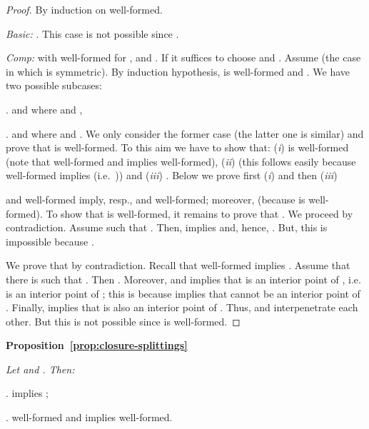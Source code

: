 \documentclass[11pt]{article}
\begin{document}
\smallskip\noindent
\begin{proof}  By induction on  well-formed.

\par\medskip\noindent
{\em Basic:} . This case is not possible since .
\par\medskip\noindent
{\em Comp:}  with  well-formed for ,  and .
If  it suffices to choose  and . Assume
 (the case in which 
is symmetric).  By induction hypothesis,  is
well-formed and .
We have  two possible subcases:

.  and  where  and , 

.  and  where  and .
We only consider the former case (the latter one is similar) and prove that  is 
well-formed. To this aim we have to show that: ({\it i})  is
well-formed (note that  well-formed and  implies 
well-formed), ({\it ii})  (this follows easily because  well-formed
implies  (i.e.\ ))
and ({\it iii}) . Below we prove first ({\it i}) and
then ({\it iii})

\par\smallskip\noindent  and 
well-formed imply, resp.,  and  well-formed; moreover,  (because  is well-formed). To show
that  is well-formed,  it remains to prove that . We proceed by contradiction. Assume  such that
. Then,  implies
 and, hence, .
But, this is impossible because .

\par\smallskip\noindent
We prove that  by
contradiction. Recall that   well-formed implies . Assume that there is  such that . Then . Moreover,  and  implies that
 is an interior point of , i.e.  is an interior
point of ; this is  because  implies that 
cannot be an interior point of . Finally,  implies that  is
also an interior  point of . Thus,  and 
interpenetrate each other. But this is not possible since  is 
well-formed.
\end{proof}

\par\bigskip\noindent
{\bf Proposition~\ref{prop:closure-splittings}}{\it
Let   and . Then:

\par\medskip{}.  implies ;

\par\smallskip{}.   well-formed and  implies  well-formed.}
\end{document}
